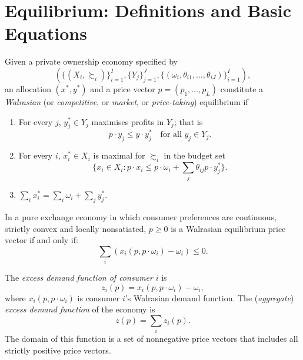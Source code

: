 \addtocounter{section}{1}

\section{Equilibrium: Definitions and Basic Equations}

\begin{defn}
    Given a private ownership economy specified by
    \begin{equation*}
        \left(\{(X_i, \succsim_i)\}_{i = 1}^I, \{Y_j\}_{j = 1}^J, \{(\omega_i, \theta_{i1}, \dots, \theta_{iJ})\}_{i = 1}^I\right),
    \end{equation*}
    an allocation $(x^*, y^*)$ and a price vector $p = (p_1, \dots, p_L)$ constitute a \emph{Walrasian} (or \emph{competitive}, or \emph{market}, or \emph{price-taking}) equilibrium if
    \begin{enumerate}
        \item
        For every $j$, $y^*_j \in Y_j$ maximises profits in $Y_j$; that is
        \begin{equation*}
            p \cdot y_j \leq y \cdot y^*_j \quad \text{for all } y_j \in Y_j.
        \end{equation*}

        \item 
        For every $i$, $x^*_i \in X_i$ is maximal for $\succsim_i$ in the budget set
        \begin{equation*}
            \{x_i \in X_i: p \cdot x_i \leq p \cdot \omega_i + \sum_j \theta_{ij} p \cdot y^*_j \}.
        \end{equation*}

        \item $\sum_i x^*_i = \sum_i \omega_i + \sum_j y^*_j$.
    \end{enumerate}
\end{defn}

\begin{prop}
    In a pure exchange economy in which consumer preferences are continuous, strictly convex and locally nonsatiated, $p \geq 0$ is a Walrasian equilibrium price vector if and only if:
    \begin{equation*}
        \sum_i \left(x_i(p, p \cdot \omega_i) - \omega_i \right) \leq 0.
    \end{equation*}
\end{prop}

\begin{defn}
    The \emph{excess demand function of consumer} $i$ is 
    \begin{equation*}
        z_i(p) = x_i(p, p \cdot \omega_i) - \omega_i,
    \end{equation*}
    where $x_i(p, p \cdot \omega_i)$  is consumer $i$'s Walrasian demand function. The (\emph{aggregate}) \emph{excess demand function} of the economy is
    \begin{equation*}
        z(p) = \sum_i z_i(p).
    \end{equation*}
    The domain of this function is a set of nonnegative price vectors that includes all strictly positive price vectors.
\end{defn}

